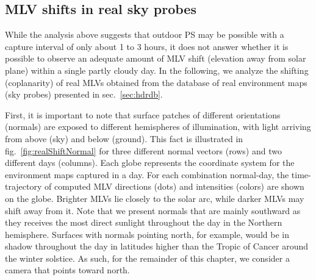\subsection{MLV shifts in real sky probes}



While the analysis above suggests that outdoor PS may be possible with a capture interval of only about 1 to 3 hours, it does not answer whether it is possible to observe an adequate amount of MLV shift (elevation away from solar plane) within a single partly cloudy day. In the following, we analyze the shifting (coplanarity) of real MLVs obtained from the database of real environment maps (sky probes) presented in sec.~\ref{sec:hdrdb}.


First, it is important to note that surface patches of different orientations (normals) are exposed to different hemispheres of illumination, with light arriving from above (sky) and below (ground). This fact is illustrated in fig.~\ref{fig:realShiftNormal} for three different normal vectors (rows) and two different days (columns). Each globe represents the coordinate system for the environment maps captured in a day. For each combination normal-day, the time-trajectory of computed MLV directions (dots) and intensities (colors) are shown on the globe. Brighter MLVs lie closely to the solar arc, while darker MLVs may shift away from it. Note that we present normals that are mainly southward as they receives the most direct sunlight throughout the day in the Northern hemisphere. Surfaces with normals pointing north, for example, would be in shadow throughout the day in latitudes higher than the Tropic of Cancer around the winter solstice. As such, for the remainder of this chapter, we consider a camera that points toward north.

